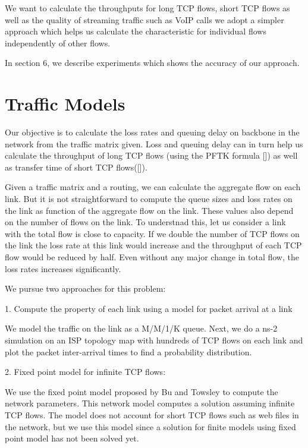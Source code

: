 We want to calculate the throughputs for long TCP flows, short TCP flows as well as the quality of streaming traffic such as VoIP calls we adopt a simpler approach which helps us calculate the characteristic for individual flows independently of other flows.

In section 6, we describe experiments which shows the accuracy of our approach.




\section{Traffic Models}
Our objective is to calculate the loss rates and queuing delay on backbone in the network from the traffic matrix given. Loss and queuing delay can in turn help us calculate the throughput of long TCP flows (using the PFTK formula []) as well as transfer time of short TCP flows([]). 

Given a traffic matrix and a routing, we can calculate the aggregate flow on each link. But it is not straightforward to compute the queue sizes and loss rates on the link as function of the aggregate flow on the link. These values also depend on the  number of flows on the link. To understnad this, let us consider a link with the total flow is close to capacity. If we double the number of TCP flows on the link the loss rate at this link would increase and the throughput of each TCP flow would be reduced by half. Even without any major change in total flow, the loss rates increases significantly.

We pursue two approaches for this problem:

1. Compute the property of each link using a model for packet arrival at a link

We model the traffic on the link as a M/M/1/K queue. Next, we do a ns-2 simulation on an ISP topology map with hundreds of TCP flows on each link and plot the packet inter-arrival times to find a probability distribution.

2. Fixed point model for infinite TCP flows:

We use the fixed point model proposed by Bu and Towsley \cite{bu01fixedpoint} to compute the network parameters. This network model computes a solution assuming infinite TCP flows. The model does not account for short TCP flows such as web files in the network, but we use this model since a solution for finite models using fixed point model has not been solved yet.


